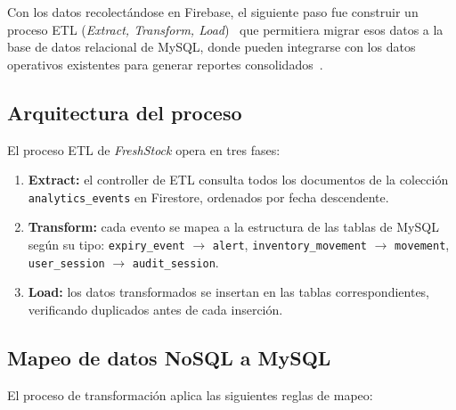 \documentclass[journal]{IEEEtran}
\newcommand{\app}{\textit{FreshStock}}
\begin{document}
	Con los datos recolect\'{a}ndose en Firebase, el siguiente paso
	fue construir un proceso ETL (\textit{Extract, Transform,
		Load})~\cite{Kimball:2013} que permitiera migrar esos datos
	a la base de datos relacional de MySQL, donde pueden
	integrarse con los datos operativos existentes para generar
	reportes consolidados~\cite{Dejun:2021}.
	
	\subsection{Arquitectura del proceso}
	\label{subsec:arquitectura-etl}
	
	El proceso ETL de \app{} opera en tres fases:
	
	\begin{enumerate}[leftmargin=*, label=\arabic*., itemsep=2pt]
		\item \textbf{Extract:} el controller de ETL consulta todos
		los documentos de la colecci\'{o}n
		\texttt{analytics\_events} en Firestore, ordenados por
		fecha descendente.
		
		\item \textbf{Transform:} cada evento se mapea a la
		estructura de las tablas de MySQL seg\'{u}n su tipo:
		\texttt{expiry\_event} $\rightarrow$ \texttt{alert},
		\texttt{inventory\_movement} $\rightarrow$ \texttt{movement},
		\texttt{user\_session} $\rightarrow$ \texttt{audit\_session}.
		
		\item \textbf{Load:} los datos transformados se insertan en
		las tablas correspondientes, verificando duplicados antes
		de cada inserci\'{o}n.
	\end{enumerate}
	
	\subsection{Mapeo de datos NoSQL a MySQL}
	\label{subsec:mapping}
	
	El proceso de transformaci\'{o}n aplica las siguientes
	reglas de mapeo:
	
\end{document}
